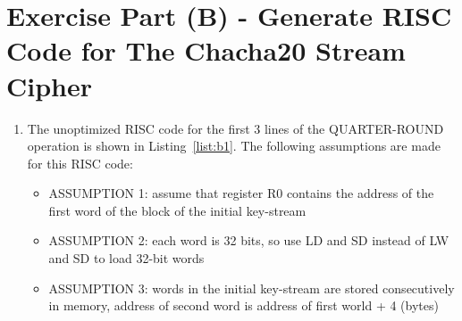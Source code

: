 \section*{Exercise Part (B) - Generate RISC Code for The Chacha20 Stream Cipher}

\begin{enumerate}[wide, label=(B\arabic*)]

\item The unoptimized RISC code for the first 3 lines of the QUARTER-ROUND operation is shown in Listing~\ref{list:b1}. The following assumptions are made for this RISC code:
\begin{itemize}
	\item ASSUMPTION 1: assume that register R0 contains the address of the first word of the block of the initial key-stream
	\item ASSUMPTION 2: each word is 32 bits, so use LD and SD instead of LW and SD to load 32-bit words
	\item ASSUMPTION 3: words in the initial key-stream are stored consecutively in memory, address of second word is address of first world + 4 (bytes)
\end{itemize}



\end{enumerate}